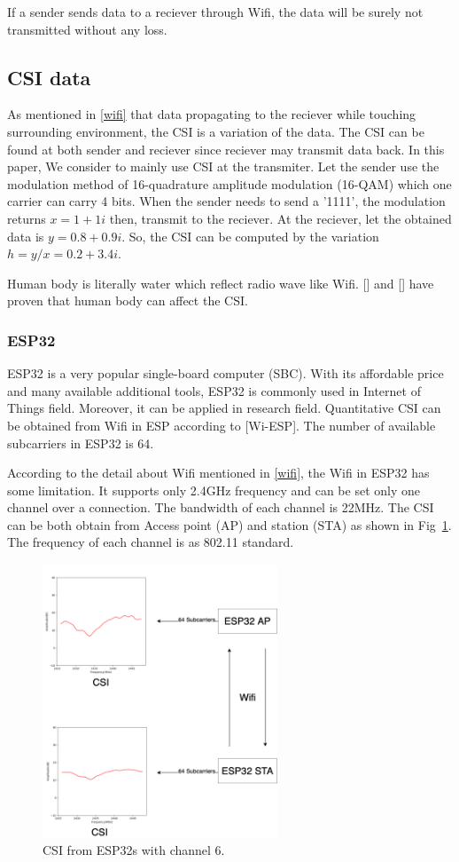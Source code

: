 \documentclass[10pt,letterpaper]{article}
\begin{document}
If a sender sends data to a reciever through Wifi, the data will be surely not transmitted without any loss.



\subsection*{CSI data}\label{CSI}
As mentioned in \ref{wifi} that data propagating to the reciever while touching surrounding environment, the CSI is a variation of the data. The CSI can  be found at both sender and reciever since reciever may transmit data back. In this paper, We consider to mainly use CSI at the transmiter. Let the sender use the modulation method of 16-quadrature amplitude modulation (16-QAM) which one carrier can carry 4 bits. When the sender needs to send a '1111', the modulation returns $x=1+1i$ then, transmit to the reciever. At the reciever, let the obtained data is $y=0.8+0.9i$. So, the CSI can be computed by the variation $h=y/x=0.2+3.4i$.

Human body is literally water which reflect radio wave like Wifi. [] and [] have proven that human body can affect the CSI.

\subsubsection*{ESP32}\label{ESP32}
ESP32 is a very popular single-board computer (SBC). With its affordable price and many available additional tools, ESP32 is commonly used in Internet of Things field. Moreover, it can be applied in research field. Quantitative CSI can be obtained from Wifi in ESP according to [Wi-ESP]. The number of available subcarriers in ESP32 is 64.

According to the detail about Wifi mentioned in \ref{wifi}, the Wifi in ESP32 has some limitation. It supports only 2.4GHz frequency and can be set only one channel over a connection. The bandwidth of each channel is 22MHz. The CSI can be both obtain from Access point (AP) and station (STA) as shown in Fig~\ref{fig:ESP32CSI01}.
The frequency of each channel is as 802.11 standard.



\begin{figure}[htbp]
	
	\centerline{\includegraphics[width=70mm,scale=0.5]{ESP32CSI01.png}}
	\caption{CSI from ESP32s with channel 6.}
	\label{fig:ESP32CSI01}
\end{figure}
\end{document}
